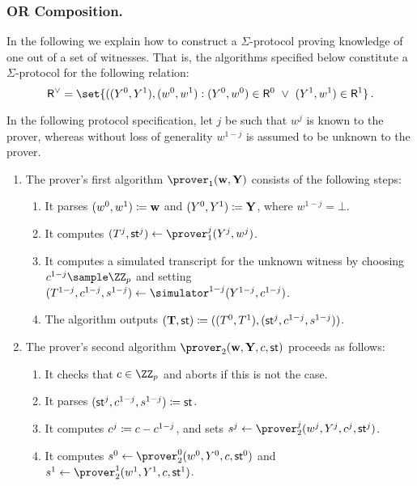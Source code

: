 \documentclass[runningheads]{llncs}
\begin{document}
\subsubsection{OR Composition.}
  In the following we explain how to construct a $\Sigma$-protocol proving knowledge of one out of a set of witnesses.
  That is, the algorithms specified below constitute a $\Sigma$-protocol for the following relation:
\[
  \relation^\lor = \set{
    ((\statement^0,\statement^1),(\witness^0,\witness^1) :
    (\statement^0,\witness^0)\in \relation^0 ~\lor~ (\statement^1,\witness^1)\in\relation^1}\,.
\]

  In the following protocol specification, let $j$ be such that $w^j$ is known to the prover, whereas without loss of generality $w^{1-j}$ is assumed to be unknown to the prover.
\begin{enumerate}
  \item
    The prover's first algorithm $\prover_1(\vec \witness, \vec \statement)$ consists of the following steps:
    \begin{enumerate}
      \item
        It parses $(w^0,w^1)\coloneqq \mathbf {w}$ and $(Y^0,Y^1)\coloneqq \mathbf {Y}$, where $w^{1-j}=\bot$.
      \item
        It computes $(\commitment^j,\st^j)\gets\prover_1^j(Y^j,w^j)$.
      \item
        It computes a simulated transcript for the unknown witness by choosing $c^{1-j}\sample\ZZ_p$ and setting $(\commitment^{1-j},c^{1-j},s^{1-j})\gets\simulator^{1-j}(Y^{1-j},c^{1-j})$.
      \item
	The algorithm outputs $(\mathbf {T},\mathsf{st}) \coloneqq ((T^0,T^1),(\mathsf{st}^j,c^{1-j},s^{1-j}))$.
    \end{enumerate}
  \item
    The prover's second algorithm $\prover_2(\vec \witness, \vec \statement,\challenge,\st)$ proceeds as follows:
    \begin{enumerate}
      \item
        It checks that $c\in\ZZ_p$ and aborts if this is not the case.
      \item
	It parses $(\mathsf{st}^j,c^{1-j},s^{1-j})\coloneqq\mathsf{st}$.
      \item
        It computes $c^j\coloneqq c-c^{1-j}$, and sets $s^j\gets\prover_2^j(w^j,Y^j,c^j,\st^j)$.
      \item
        It computes $s^0\gets\prover_2^0(\witness^0,\statement^0,\challenge,\st^0)$ and $s^1\gets\prover_2^1(\witness^1,\statement^1,\challenge,\st^1)$.

\end{enumerate}
\end{enumerate}
\end{document}

